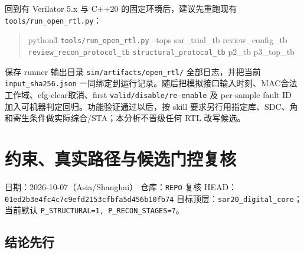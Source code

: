 \documentclass[UTF8,fontset=fandol,10pt,a4paper,openany]{ctexrep}
\newcommand{\code}[1]{\nolinkurl{#1}}
\begin{document}
回到有 Verilator 5.x 与 C++20 的固定环境后，建议先重跑现有 \code{tools/run_open_rtl.py}：


\begin{quote}\small\ttfamily\raggedright
python3 \code{tools/run_open_rtl.py} --tops sar\_trial\_tb review\_config\_tb \code{review_recon_protocol_tb} \code{structural_protocol_tb} p2\_tb p3\_top\_tb
\end{quote}


保存 runner 输出目录 \code{sim/artifacts/open_rtl/} 全部日志，并把当前 \code{input_sha256.json} 一同绑定到运行记录。随后把模拟接口输入时刻、MAC合法工作域、cfg-clear取消、first \code{valid/disable/re-enable} 及 per-sample fault ID 加入可机器判定回归。功能验证通过以后，按 skill 要求另行用指定库、SDC、角和寄生条件做实际综合/STA；本分析不晋级任何 RTL 改写候选。
\chapter{约束、真实路径与候选门控复核}


日期：2026-10-07（Asia/Shanghai）
仓库：\code{REPO}
复核 HEAD：\code{01ed2b3e4fc4c7c9efd2153cfbfa5d456b10fb74}
目标顶层：\code{sar20_digital_core}；当前默认 \code{P_STRUCTURAL=1, P_RECON_STAGES=7}。


\section{结论先行}
\end{document}
